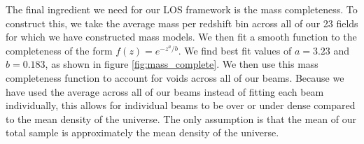 The final ingredient we need for our LOS framework is the mass completeness. To construct this, we take the average mass per redshift bin across all of our 23 fields for which we have constructed mass models. We then fit a smooth function to the completeness of the form $f(z) = e^{-z^a / b}$. We find best fit values of $a = 3.23$ and $b = 0.183$, as shown in figure \ref{fig:mass_complete}. We then use this mass completeness function to account for voids across all of our beams. Because we have used the average across all of our beams instead of fitting each beam individually, this allows for individual beams to be over or under dense compared to the mean density of the universe. The only assumption is that the mean of our total sample is approximately the mean density of the universe.  
  
  